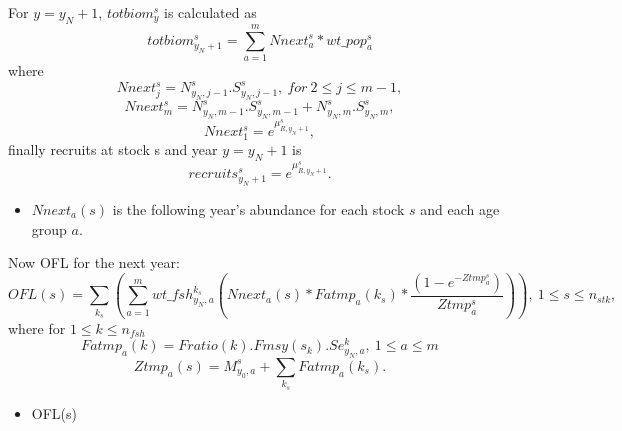 \documentclass{article}
\begin{document}
For $y=y_N+1$, $totbiom^s_y$ is calculated as
\begin{equation}
totbiom^s_{y_N+1}=\sum_{a=1}^m Nnext^s_a*wt\_pop^s_a
\end{equation}
where 
\begin{equation}
Nnext^s_j=N^s_{y_N,j-1}.S^s_{y_N,j-1}, \ for \ 2\leq j\leq m-1,
\end{equation}
\begin{equation}
Nnext^s_m=N^s_{y_N,m-1}.S^s_{y_N,m-1}+N^s_{y_N,m}.S^s_{y_N,m},
\end{equation}
\begin{equation}
    Nnext^s_1=e^{\mu^s_{R,y_N+1}},
\end{equation}
finally recruits at stock s and year $y=y_N+1$ is
\begin{equation}
recruits^s_{y_N+1}=e^{\mu^s_{R,y_N+1}}.
\end{equation}

\begin{itemize}
    \item $Nnext_a(s)$ is the following year's abundance for each stock $s$ and each age group $a$.

\end{itemize}
Now OFL for the next year:
\begin{equation}
    OFL(s) =\sum_{k_s} \left(\sum_{a=1}^mwt\_fsh^{k_s}_{y_N,a} \left(Nnext_a(s) * Fatmp_a(k_s) * \dfrac{(1 - e^{-Ztmp^s_a})}{Ztmp^s_a}\right)\right), \ 1\leq s \leq n_{stk},
\end{equation}
where for $1\leq k \leq n_{fsh}$ 
\begin{equation}
    Fatmp_a(k)=Fratio(k).Fmsy(s_k).Se^k_{y_N,a}, \  1\leq a \leq m
\end{equation}
\begin{equation}
    Ztmp_a(s)=M^s_{y_0,a}+ \sum_{k_s}Fatmp_a(k_s).
\end{equation}
\begin{itemize}
    \item OFL(s)
\end{itemize}
\end{document}
